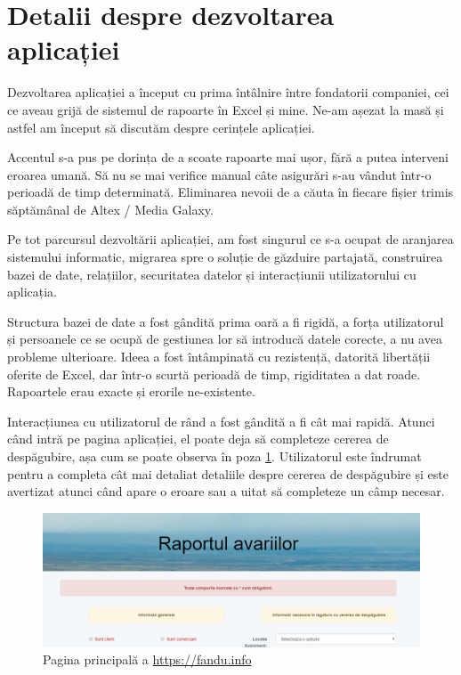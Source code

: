 \section*{Detalii despre dezvoltarea aplicației}
	Dezvoltarea aplicației a început cu prima întâlnire între fondatorii companiei, cei ce aveau grijă de sistemul de rapoarte în Excel și mine.
	Ne-am așezat la masă și astfel am început să discutăm despre cerințele aplicației.

	Accentul s-a pus pe dorința de a scoate rapoarte mai ușor, fără a putea interveni eroarea umană.
	Să nu se mai verifice manual câte asigurări s-au vândut într-o perioadă de timp determinată.
	Eliminarea nevoii de a căuta în fiecare fișier trimis săptămânal de Altex / Media Galaxy.

	Pe tot parcursul dezvoltării aplicației, am fost singurul ce s-a ocupat de aranjarea sistemului informatic, migrarea spre o soluție de găzduire partajată, construirea bazei de date, relațiilor, securitatea datelor și interacțiunii utilizatorului cu aplicația.

	Structura bazei de date a fost gândită prima oară a fi rigidă, a forța utilizatorul și persoanele ce se ocupă de gestiunea lor să introducă datele corecte, a nu avea probleme ulterioare.
	Ideea a fost întâmpinată cu rezistență, datorită libertății oferite de Excel, dar într-o scurtă perioadă de timp, rigiditatea a dat roade.
	Rapoartele erau exacte și erorile ne-existente.

	Interacțiunea cu utilizatorul de rând a fost gândită a fi cât mai rapidă.
	Atunci când intră pe pagina aplicației, el poate deja să completeze cererea de despăgubire, așa cum se poate observa în poza \ref{fig:pagina_principala}.
	Utilizatorul este îndrumat pentru a completa cât mai detaliat detaliile despre cererea de despăgubire și este avertizat atunci când apare o eroare sau a uitat să completeze un câmp necesar.
	\begin{figure}
	\includegraphics[width=\linewidth]{../imagini/main.png}
	\caption{Pagina principală a \url{https://fandu.info}}
	\label{fig:pagina_principala}
	\end{figure}

